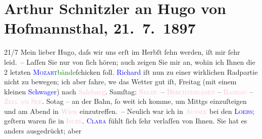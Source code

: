 

               \section[Arthur Schnitzler an Hugo von Hofmannsthal, 21. 7. 1897]{ Arthur Schnitzler an Hugo von Hofmannsthal, 21. 7. 1897}\nopagebreak{}\rehead{ }\normalsize\beginnumbering{} \toendnotes[C]{\smallbreak\pagebreak[2]} 
\toendnotes[C]{\smallbreak}\pstart
           \raggedleft{}{\pb}21/7\pend
           \pstart{} Mein lieber Hugo, \pend\pstart
           daſs wir uns erſt im Herbſt ſehn werden, iſt mir ſehr leid. – Laſſen Sie nur von
                    ſich hören; auch zeigen Sie mir an, wohin ich Ihnen die 2 letzten \textcolor{green}{\textcolor{blue}{\textsc{Mozart}}{}\ledrightnote{\textcolor{blue}{Wolfgang Amadeus Mozart}}bände}{}ſchicken ſoll.\pend
           \pstart
           \textcolor{blue}{Richard}{}\ledrightnote{\textcolor{blue}{Richard Beer-Hofmann}} iſt nun zu einer wirklichen
                    Radpartie nicht zu bewegen; {\pb}ich aber fahre, we{\geminationn} das Wetter gut iſt, Freitag (mit
                    einem kleinen \textcolor{blue}{Schwager}{}) nach \textcolor{pink}{Salzburg}{}\ledrightnote{\textcolor{pink}{Salzburg}}.
                        Samſtag: \textsc{\textcolor{pink}{Salzb.}{}\ledrightnote{\textcolor{pink}{Salzburg}} – \textcolor{pink}{Berchtesgaden}{}\ledrightnote{\textcolor{pink}{Berchtesgaden}} – \textcolor{pink}{Ramsau}{}\ledrightnote{\textcolor{pink}{Ramsau bei Berchtesgaden}} – \textcolor{pink}{Zell am See}{}\ledrightnote{\textcolor{pink}{Zell am See}}}. So{\geminationn}tag – an der Bahn, ſo weit
                    ich komme, um Mittgs einzuſteigen und am Abend in \textcolor{pink}{Wien}{}\ledrightnote{\textcolor{pink}{Wien}} einzutreffen. –\pend
           \pstart
           {\pb}Neulich war ich in \textcolor{pink}{\textsc{Aussee}}{}\ledrightnote{\textcolor{pink}{Bad Aussee}} bei den \textcolor{blue}{\textsc{Loebs}}{}\ledrightnote{\textcolor{blue}{Louis Loeb}{\newline}\textcolor{blue}{Regina Loeb}}; geſtern waren ſie in \textcolor{pink}{\textsc{Ischl}}{}\ledrightnote{\textcolor{pink}{Bad Ischl}}. \textcolor{blue}{\textsc{Clara}}{}\ledrightnote{\textcolor{blue}{Clara Katharina Pollaczek}} fühlt ſich ſehr verlaſſen von Ihnen. Sie hat es anders ausgedrückt; aber
